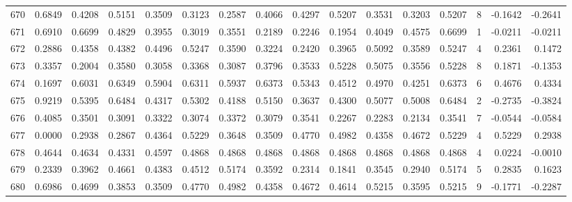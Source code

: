 \begin{tabular}{lrrrrrrrrrrrrrrr}
670 &      0.6849 &  0.4208 &  0.5151 &  0.3509 &  0.3123 &  0.2587 &  0.4066 &  0.4297 &  0.5207 &  0.3531 &   0.3203 &     0.5207 &      8 &                   -0.1642 &                    -0.2641 \\
671 &      0.6910 &  0.6699 &  0.4829 &  0.3955 &  0.3019 &  0.3551 &  0.2189 &  0.2246 &  0.1954 &  0.4049 &   0.4575 &     0.6699 &      1 &                   -0.0211 &                    -0.0211 \\
672 &      0.2886 &  0.4358 &  0.4382 &  0.4496 &  0.5247 &  0.3590 &  0.3224 &  0.2420 &  0.3965 &  0.5092 &   0.3589 &     0.5247 &      4 &                    0.2361 &                     0.1472 \\
673 &      0.3357 &  0.2004 &  0.3580 &  0.3058 &  0.3368 &  0.3087 &  0.3796 &  0.3533 &  0.5228 &  0.5075 &   0.3556 &     0.5228 &      8 &                    0.1871 &                    -0.1353 \\
674 &      0.1697 &  0.6031 &  0.6349 &  0.5904 &  0.6311 &  0.5937 &  0.6373 &  0.5343 &  0.4512 &  0.4970 &   0.4251 &     0.6373 &      6 &                    0.4676 &                     0.4334 \\
675 &      0.9219 &  0.5395 &  0.6484 &  0.4317 &  0.5302 &  0.4188 &  0.5150 &  0.3637 &  0.4300 &  0.5077 &   0.5008 &     0.6484 &      2 &                   -0.2735 &                    -0.3824 \\
676 &      0.4085 &  0.3501 &  0.3091 &  0.3322 &  0.3074 &  0.3372 &  0.3079 &  0.3541 &  0.2267 &  0.2283 &   0.2134 &     0.3541 &      7 &                   -0.0544 &                    -0.0584 \\
677 &      0.0000 &  0.2938 &  0.2867 &  0.4364 &  0.5229 &  0.3648 &  0.3509 &  0.4770 &  0.4982 &  0.4358 &   0.4672 &     0.5229 &      4 &                    0.5229 &                     0.2938 \\
678 &      0.4644 &  0.4634 &  0.4331 &  0.4597 &  0.4868 &  0.4868 &  0.4868 &  0.4868 &  0.4868 &  0.4868 &   0.4868 &     0.4868 &      4 &                    0.0224 &                    -0.0010 \\
679 &      0.2339 &  0.3962 &  0.4661 &  0.4383 &  0.4512 &  0.5174 &  0.3592 &  0.2314 &  0.1841 &  0.3545 &   0.2940 &     0.5174 &      5 &                    0.2835 &                     0.1623 \\
680 &      0.6986 &  0.4699 &  0.3853 &  0.3509 &  0.4770 &  0.4982 &  0.4358 &  0.4672 &  0.4614 &  0.5215 &   0.3595 &     0.5215 &      9 &                   -0.1771 &                    -0.2287 \\

\end{tabular}

